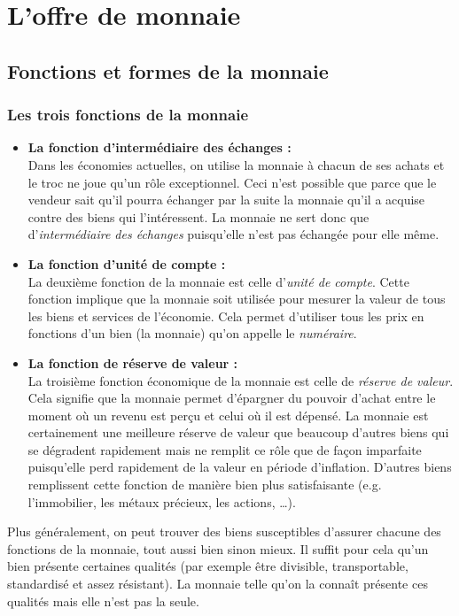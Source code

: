 \documentclass[10pt]{book}
\begin{document}
\section{L'offre de monnaie}
\subsection{Fonctions et formes de la monnaie}
\subsubsection{Les trois fonctions de la monnaie}
\begin{itemize}
  \item \textbf{La fonction d'intermédiaire des échanges :} \\
    Dans les économies actuelles, on utilise la monnaie à chacun de ses achats et le troc ne joue qu'un rôle exceptionnel. Ceci n'est possible que parce que le vendeur sait qu'il pourra échanger par la suite la monnaie qu'il a acquise contre des biens qui l'intéressent. La monnaie ne sert donc que d'\textit{intermédiaire des échanges} puisqu'elle n'est pas échangée pour elle même.
  \item \textbf{La fonction d'unité de compte :} \\
    La deuxième fonction de la monnaie est celle d'\textit{unité de compte}. Cette fonction implique que la monnaie soit utilisée pour mesurer la valeur de tous les biens et services de l'économie. Cela permet d'utiliser tous les prix en fonctions d'un bien (la monnaie) qu'on appelle le \textit{numéraire}.
  \item \textbf{La fonction de réserve de valeur :} \\
La troisième fonction économique de la monnaie est celle de \textit{réserve de valeur}. Cela signifie que la monnaie permet d'épargner du pouvoir d'achat entre le moment où un revenu est perçu et celui où il est dépensé. La monnaie est certainement une meilleure réserve de valeur que beaucoup d'autres biens qui se dégradent rapidement mais ne remplit ce rôle que de façon imparfaite puisqu'elle perd rapidement de la valeur en période d'inflation. D'autres biens remplissent cette fonction de manière bien plus satisfaisante (e.g. l'immobilier, les métaux précieux, les actions, \ldots).
\end{itemize}
Plus généralement, on peut trouver des biens susceptibles d'assurer chacune des fonctions de la monnaie, tout aussi bien sinon mieux. Il suffit pour cela qu'un bien présente certaines qualités (par exemple être divisible, transportable, standardisé et assez résistant). La monnaie telle qu'on la connaît présente ces qualités mais elle n'est pas la seule.
\end{document}
